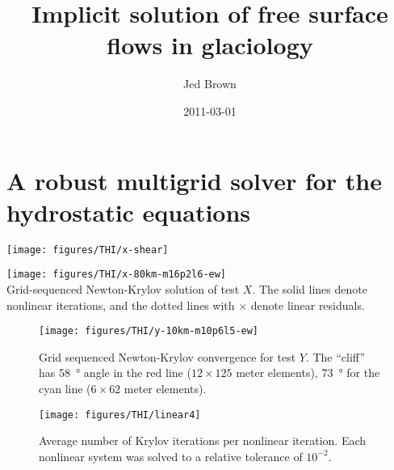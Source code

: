 \documentclass{beamer}
\title{Implicit solution of free surface flows in glaciology}
\author{Jed Brown}
\institute[ETH Z\"urich]
{
  Laboratory of Hydrology, Hydraulics, and Glaciology \\
  ETH Z\"urich
}
\date[2011-03-01]{2011-03-01}
\begin{document}
\lstset{language=C}
\normalem

\begin{frame}
\titlepage
\end{frame}





\section[Hydrostatic]{A robust multigrid solver for the hydrostatic equations}

\begin{frame}
  \texttt{[image: figures/THI/x-shear]}
\end{frame}
\begin{frame}
  \texttt{[image: figures/THI/x-80km-m16p2l6-ew]} \\
  Grid-sequenced Newton-Krylov solution of test $X$.  The solid lines denote nonlinear iterations, and the dotted lines with $\times$ denote linear residuals.
\end{frame}

\begin{frame}
  \begin{figure}
    \texttt{[image: figures/THI/y-10km-m10p6l5-ew]}
    \centering\caption{Grid sequenced Newton-Krylov convergence for test $Y$.
    The ``cliff'' has \SI{58}{\degree} angle in the red line ($12\times 125$ meter elements), \SI{73}{\degree} for the cyan line ($6\times 62$ meter elements).}\label{fig:testy}
  \end{figure}
\end{frame}
\begin{frame}
  \begin{figure}
    \texttt{[image: figures/THI/linear4]}
    \centering\caption{Average number of Krylov iterations per nonlinear iteration.  Each nonlinear system was solved to a relative tolerance of $10^{-2}$.}\label{fig:linear}
  \end{figure}
\end{frame}
\end{document}
